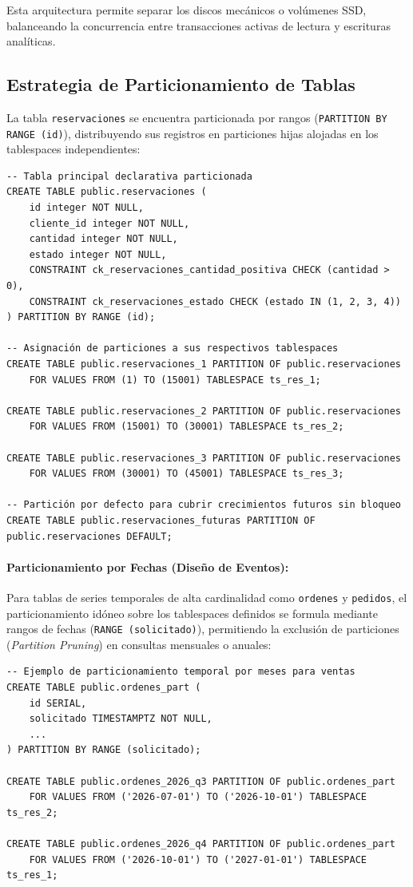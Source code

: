 \documentclass[11pt,letterpaper]{article}
\begin{document}
Esta arquitectura permite separar los discos mecánicos o volúmenes SSD, balanceando la concurrencia entre transacciones activas de lectura y escrituras analíticas.

\subsection{Estrategia de Particionamiento de Tablas}
La tabla \texttt{reservaciones} se encuentra particionada por rangos (\texttt{PARTITION BY RANGE (id)}), distribuyendo sus registros en particiones hijas alojadas en los tablespaces independientes:
\begin{lstlisting}[style=sqlstyle]
-- Tabla principal declarativa particionada
CREATE TABLE public.reservaciones (
    id integer NOT NULL,
    cliente_id integer NOT NULL,
    cantidad integer NOT NULL,
    estado integer NOT NULL,
    CONSTRAINT ck_reservaciones_cantidad_positiva CHECK (cantidad > 0),
    CONSTRAINT ck_reservaciones_estado CHECK (estado IN (1, 2, 3, 4))
) PARTITION BY RANGE (id);

-- Asignación de particiones a sus respectivos tablespaces
CREATE TABLE public.reservaciones_1 PARTITION OF public.reservaciones
    FOR VALUES FROM (1) TO (15001) TABLESPACE ts_res_1;

CREATE TABLE public.reservaciones_2 PARTITION OF public.reservaciones
    FOR VALUES FROM (15001) TO (30001) TABLESPACE ts_res_2;

CREATE TABLE public.reservaciones_3 PARTITION OF public.reservaciones
    FOR VALUES FROM (30001) TO (45001) TABLESPACE ts_res_3;

-- Partición por defecto para cubrir crecimientos futuros sin bloqueo
CREATE TABLE public.reservaciones_futuras PARTITION OF public.reservaciones DEFAULT;
\end{lstlisting}

\paragraph{Particionamiento por Fechas (Diseño de Eventos):}
Para tablas de series temporales de alta cardinalidad como \texttt{ordenes} y \texttt{pedidos}, el particionamiento idóneo sobre los tablespaces definidos se formula mediante rangos de fechas (\texttt{RANGE (solicitado)}), permitiendo la exclusión de particiones (\textit{Partition Pruning}) en consultas mensuales o anuales:
\begin{lstlisting}[style=sqlstyle]
-- Ejemplo de particionamiento temporal por meses para ventas
CREATE TABLE public.ordenes_part (
    id SERIAL,
    solicitado TIMESTAMPTZ NOT NULL,
    ...
) PARTITION BY RANGE (solicitado);

CREATE TABLE public.ordenes_2026_q3 PARTITION OF public.ordenes_part
    FOR VALUES FROM ('2026-07-01') TO ('2026-10-01') TABLESPACE ts_res_2;

CREATE TABLE public.ordenes_2026_q4 PARTITION OF public.ordenes_part
    FOR VALUES FROM ('2026-10-01') TO ('2027-01-01') TABLESPACE ts_res_1;
\end{lstlisting}
\end{document}
